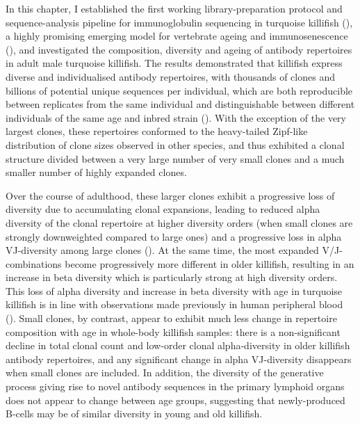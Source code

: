 In this chapter, I established the first working library-preparation protocol and sequence-analysis pipeline for immunoglobulin sequencing in turquoise killifish (\nfu), a highly promising emerging model for vertebrate ageing and immunosenescence (), and investigated the composition, diversity and ageing of antibody repertoires in adult male turquoise killifish. The results demonstrated that killifish express diverse and individualised antibody repertoires, with thousands of clones and billions of potential unique sequences per individual, which are both reproducible between replicates from the same individual and distinguishable between different individuals of the same age and inbred strain (). With the exception of the very largest clones, these repertoires conformed to the heavy-tailed Zipf-like distribution of clone sizes observed in other species, and thus exhibited a clonal structure divided between a very large number of very small clones and a much smaller number of highly expanded clones.

Over the course of adulthood, these larger clones exhibit a progressive loss of diversity due to accumulating clonal expansions, leading to reduced alpha diversity of the clonal repertoire at higher diversity orders (when small clones are strongly downweighted compared to large ones) and a progressive loss in alpha VJ-diversity among large clones (). At the same time, the most expanded V/J-combinations become progressively more different in older killifish, resulting in an increase in beta diversity which is particularly strong at high diversity orders. This loss of alpha diversity and increase in beta diversity with age in turquoise killifish is in line with observations made previously in human peripheral blood (). Small clones, by contrast, appear to exhibit much less change in repertoire composition with age in whole-body killifish samples: there is a non-significant decline in total clonal count and low-order clonal alpha-diversity in older killifish antibody repertoires, and any significant change in alpha VJ-diversity disappears when small clones are included. In addition, the diversity of the generative process giving rise to novel antibody sequences in the primary lymphoid organs does not appear to change between age groups, suggesting that newly-produced \naive B-cells may be of similar diversity in young and old killifish.

